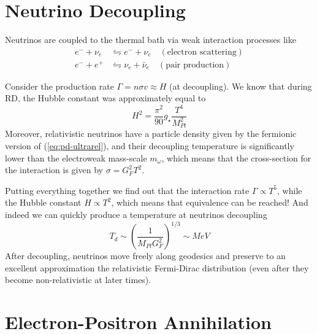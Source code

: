 \section{Neutrino Decoupling}

Neutrinos are coupled to the thermal bath via weak interaction processes like
\begin{align*}
    e^{-} + \nu_{e} &\leftrightharpoons e^{-} + \nu_{e} \quad (\text{electron scattering})\\
    e^{-} + e^{+} &\leftrightharpoons \nu_{e} + \bar{\nu}_{e} \quad (\text{pair production})
\end{align*}
\par Consider the production rate $\Gamma = n\sigma v \approx H$ (at decoupling). We know that during RD, the Hubble constant was approximately equal to 
\begin{equation}
    H^{2} = \frac{\pi^{2}}{90}g_{\star}\frac{T^{4}}{M_{Pl}^{2}}
\end{equation}
Moreover, relativistic neutrinos have a particle density given by the fermionic version of (\ref{eq:pd-ultrarel}), and their decoupling temperature is significantly lower than the electroweak mass-scale $m_{\omega}$, which means that the cross-section for the interaction is given by $\sigma = G_{F}^{2}T^{2}$.
\par Putting everything together we find out that the interaction rate $\Gamma \propto T^{5}$, while the Hubble constant $H \propto T^{2}$, which means that equivalence can be reached! And indeed we can quickly produce a temperature at neutrinos decoupling 
\begin{equation}
    \boxed{
    T_{d} \sim \left(\frac{1}{M_{Pl}G_{F}^{2}}\right)^{1/3} \sim \unit{MeV}
    }
    \label{eq:neutrino_dec}
\end{equation}
After decoupling, neutrinos move freely along geodesics and preserve to an excellent approximation the relativistic Fermi-Dirac distribution (even after they become non-relativistic at later times).

\section{Electron-Positron Annihilation}

